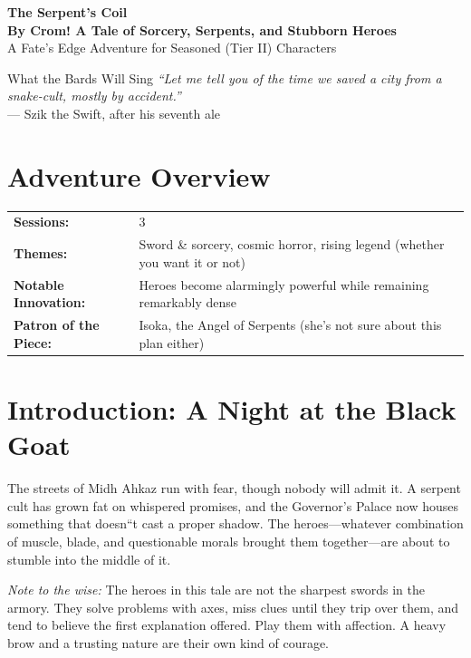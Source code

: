 \documentclass[11pt]{article}
\begin{document}


\begin{center}
    \textbf{\LARGE The Serpent's Coil} \\
    \vspace{0.2cm}
    \textbf{By Crom! A Tale of Sorcery, Serpents, and Stubborn Heroes} \\
    \vspace{0.1cm}
    \small A Fate's Edge Adventure for Seasoned (Tier II) Characters
\end{center}

\begin{sorcerybox}{What the Bards Will Sing}
\textit{``Let me tell you of the time we saved a city from a snake-cult, mostly by accident.''} \\
--- Szik the Swift, after his seventh ale
\end{sorcerybox}

\section*{Adventure Overview}
\begin{longtable}{@{}ll}
    \textbf{Sessions:} & 3 \\
    \textbf{Themes:} & Sword \& sorcery, cosmic horror, rising legend (whether you want it or not) \\
    \textbf{Notable Innovation:} & Heroes become alarmingly powerful while remaining remarkably dense \\
    \textbf{Patron of the Piece:} & Isoka, the Angel of Serpents (she's not sure about this plan either)
\end{longtable}

\section*{Introduction: A Night at the Black Goat}
The streets of Midh Ahkaz run with fear, though nobody will admit it. A serpent cult has grown fat on whispered promises, and the Governor's Palace now houses something that doesn``t cast a proper shadow. The heroes---whatever combination of muscle, blade, and questionable morals brought them together---are about to stumble into the middle of it.

\textit{Note to the wise:} The heroes in this tale are not the sharpest swords in the armory. They solve problems with axes, miss clues until they trip over them, and tend to believe the first explanation offered. Play them with affection. A heavy brow and a trusting nature are their own kind of courage.
\end{document}
